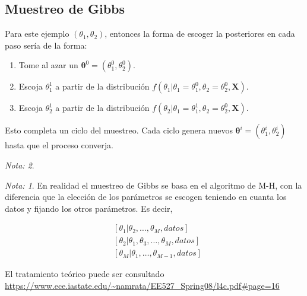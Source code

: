 \documentclass[
  12pt,
]{book}
\providecommand{\tightlist}{%
  \setlength{\itemsep}{0pt}\setlength{\parskip}{0pt}}
\theoremstyle{definition}
\theoremstyle{definition}
\theoremstyle{definition}
\theoremstyle{remark}
\newtheorem*{remark}{Nota: }
\begin{document}
\hypertarget{muestreo-de-gibbs}{%
\subsection{Muestreo de Gibbs}\label{muestreo-de-gibbs}}

Para este ejemplo \(\left( \theta_{1},\theta_{2} \right)\), entonces la forma de escoger la posteriores en cada paso sería de la forma:

\begin{enumerate}
\def\labelenumi{\arabic{enumi}.}
\tightlist
\item
  Tome al azar un \(\boldsymbol{\theta}^{0} = \left( \theta_{1}^{0},\theta_{2}^{0} \right)\).
\item
  Escoja \(\theta_{1}^{1}\) a partir de la distribución
  \(f\left(\theta_{1} \vert \theta_{1}=\theta_{1}^{0}, \theta_{2}=\theta_{2}^{0}, \boldsymbol{X} \right)\).
\item
  Escoja \(\theta_{2}^{1}\) a partir de la distribución
  \(f\left(\theta_{2} \vert \theta_{1}=\theta_{1}^{1}, \theta_{2}=\theta_{2}^{0}, \boldsymbol{X} \right)\).
\end{enumerate}

Esto completa un ciclo del muestreo. Cada ciclo genera nuevos \(\boldsymbol{\theta}^{i} = \left( \theta_{1}^{i},\theta_{2}^{i} \right)\) hasta que el proceso converja.

\begin{remark}
\begin{remark}

{}En realidad el muestreo de Gibbs se basa en el algoritmo de M-H, con la diferencia que la elección de los parámetros se escogen teniendo en cuanta los datos y fijando los otros parámetros. Es decir,

\begin{align*}
&{\left[\theta_{1} | \theta_{2}, \ldots, \theta_{M}, datos \right]} \\
&{\left[\theta_{2} | \theta_{1}, \theta_{3}, \ldots, \theta_{M}, datos \right]} \\
&{\left[\theta_{M} | \theta_{1}, \ldots, \theta_{M-1}, datos \right]}
\end{align*}

\end{remark}
\end{remark}

El tratamiento teórico puede ser consultado \url{https://www.ece.iastate.edu/~namrata/EE527_Spring08/l4c.pdf\#page=16}
\end{document}
